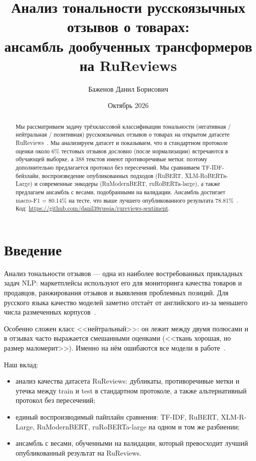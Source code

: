 \documentclass{article}
\title{Анализ тональности русскоязычных отзывов о товарах: \\ ансамбль дообученных трансформеров на RuReviews}
\author{Баженов Данил Борисович}
\date{Октябрь 2026}
\newcommand{\fEns}{80.14}
\begin{document}
\sloppy
\maketitle

\begin{abstract}
Мы рассматриваем задачу трёхклассовой классификации тональности (негативная / нейтральная / позитивная) русскоязычных отзывов о товарах на открытом датасете RuReviews~\cite{smetanin2019rureviews}. Мы анализируем датасет и показываем, что в стандартном протоколе оценки около 6\% тестовых отзывов дословно (после нормализации) встречаются в обучающей выборке, а 388 текстов имеют противоречивые метки; поэтому дополнительно предлагается протокол без пересечений. Мы сравниваем TF-IDF-бейзлайн, воспроизведение опубликованных подходов (RuBERT, XLM-RoBERTa-Large) и современные энкодеры (RuModernBERT, ruRoBERTa-large), а также предлагаем ансамбль с весами, подобранными на валидации. Ансамбль достигает macro-F1 = \fEns\% на тесте, что выше лучшего опубликованного результата 78.81\%~\cite{smetanin2022transformers}.
Код: \url{https://github.com/danil39russia/rureviews-sentiment}.
\end{abstract}

\section{Введение}
Анализ тональности отзывов --- одна из наиболее востребованных прикладных задач NLP: маркетплейсы используют его для мониторинга качества товаров и продавцов, ранжирования отзывов и выявления проблемных позиций. Для русского языка качество моделей заметно отстаёт от английского из-за меньшего числа размеченных корпусов~\cite{kotelnikov2021landscape}.

Особенно сложен класс <<нейтральный>>: он лежит между двумя полюсами и в отзывах часто выражается смешанными оценками (<<ткань хорошая, но размер маломерит>>). Именно на нём ошибаются все модели в работе~\cite{smetanin2021deep}.

Наш вклад:
\begin{itemize}
    \item анализ качества датасета RuReviews: дубликаты, противоречивые метки и утечка между train и test в стандартном протоколе, а также альтернативный протокол без пересечений;
    \item единый воспроизводимый пайплайн сравнения: TF-IDF, RuBERT, XLM-R-Large, RuModernBERT, ruRoBERTa-large на одном и том же разбиении;
    \item ансамбль с весами, обученными на валидации, который превосходит лучший опубликованный результат на RuReviews.
\end{itemize}
\end{document}
